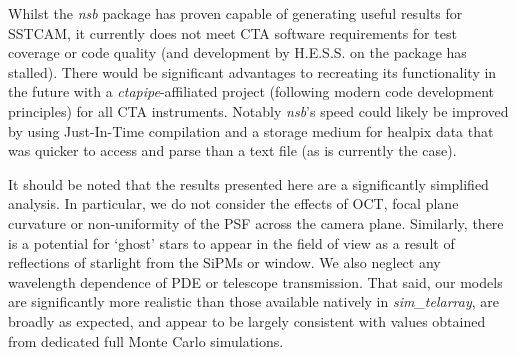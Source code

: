 Whilst the \textit{nsb} package has proven capable of generating useful results for SSTCAM, it currently does not meet CTA software requirements for test coverage or code quality (and development by H.E.S.S. on the package has stalled). There would be significant advantages to recreating its functionality in the future with a \textit{ctapipe}-affiliated project (following modern code development principles) for all CTA instruments. Notably \textit{nsb}'s speed could likely be improved by using Just-In-Time compilation and a storage medium for healpix data that was quicker to access and parse than a text file (as is currently the case).

It should be noted that the results presented here are a significantly simplified analysis. In particular, we do not consider the effects of OCT, focal plane curvature or non-uniformity of the PSF across the camera plane. Similarly, there is a potential for `ghost' stars to appear in the field of view as a result of reflections of starlight from the SiPMs or window. We also neglect any wavelength dependence of PDE or telescope transmission. That said, our models are significantly more realistic than those available natively in \textit{sim\_telarray}, are broadly as expected, and appear to be largely consistent with values obtained from dedicated full Monte Carlo simulations.



